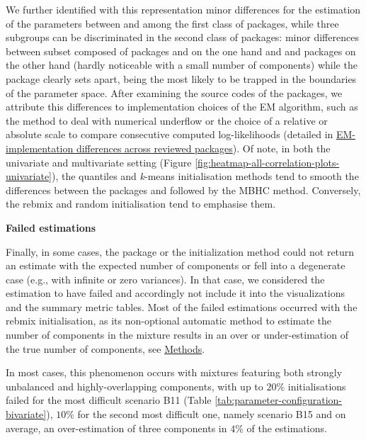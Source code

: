 We further identified with this representation minor differences for the estimation of the parameters
between  and  among the first class of packages, while three subgroups can be discriminated in the second class of packages: minor differences between subset composed of packages  and  on the one hand and  and  packages on the other hand (hardly noticeable with a small number of components) while the
 package clearly sets apart, being the most likely to be trapped in the boundaries of the parameter space. After examining the source codes of the packages, we attribute this differences to implementation choices of the EM algorithm, such as the method to deal with numerical underflow or the choice of a relative or absolute scale to compare consecutive computed log-likelihoods (detailed in \protect\hyperlink{em-implementation-differences-across-reviewed-packages}{EM-implementation differences across reviewed packages}). Of note, in both the univariate and multivariate setting (Figure \ref{fig:heatmap-all-correlation-plots-univariate}), the quantiles and \emph{k}-means initialisation methods tend to smooth the differences between the packages and followed by the MBHC method. Conversely, the rebmix and random initialisation tend to emphasise them.

\textbf{Failed estimations}

Finally, in some cases, the package or the initialization method could not return an estimate with the expected number of components or fell into a degenerate case (e.g., with infinite or zero variances). In that case, we considered the estimation to have failed and accordingly not include it into the visualizations and the summary metric tables. Most of the failed estimations occurred with the rebmix initialisation, as its non-optional automatic method to estimate the number of components in the mixture results in an over or under-estimation of the true number of components, see \protect\hyperlink{methods}{Methods}.

In most cases, this phenomenon occurs with mixtures featuring both strongly unbalanced and highly-overlapping components, with up to \(20\%\) initialisations failed for the most difficult scenario B11 (Table \ref{tab:parameter-configuration-bivariate}), \(10\%\) for the second most difficult one, namely scenario B15 and on average, an over-estimation of three components in \(4\%\) of the estimations.

